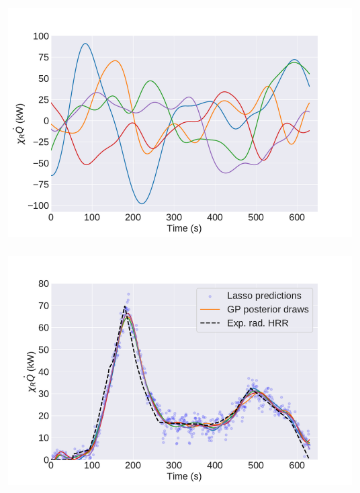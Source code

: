\documentclass{article}
\begin{document}
\begin{figure}[htbp]
  \centering
  \begin{subfigure}[t]{.45\textwidth}
      \centering
      \includegraphics[width=\textwidth,keepaspectratio]{figures/gp_prior.pdf}
      \caption{}
      \label{fig:gp_prior}
  \end{subfigure}
  \begin{subfigure}[t]{.45\textwidth}
      \centering
      \includegraphics[width=\textwidth ,keepaspectratio]{figures/gp_posterior.pdf}
      \caption{}
      \label{fig:gp_posterior}
  \end{subfigure}
  \caption{} 
  \label{fig:gp_regression_example}
\end{figure}
\end{document}
